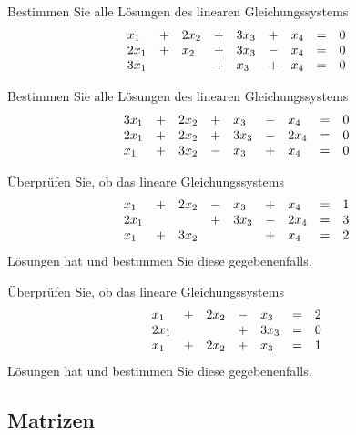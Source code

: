 \bigbreak

\begin{aufgabe} Bestimmen Sie alle Lösungen des linearen Gleichungssystems
  	$$ \begin{array} {l c l c l c l c l}
   	x_1 & + & 2 x_2 & + & 3 x_3 & + & x_4 & = & 0 \\
   	2 x_1 & +  & x_2 & + & 3 x_3 & - &  x_4 & = & 0 \\
   	3 x_1 &   &  & + & x_3 & + & x_4 & = & 0 
   	\end{array} $$
\end{aufgabe}

\begin{aufgabe} Bestimmen Sie alle Lösungen des linearen Gleichungssystems
  	$$ \begin{array} {l c l c l c l c l}
   	3 x_1 & + & 2 x_2 & + &  x_3 & - & x_4 & = & 0 \\
   	2 x_1 & +  & 2 x_2 & + & 3 x_3 & - & 2 x_4 & = & 0 \\
   	x_1 & + & 3 x_2 & - & x_3 & + & x_4 & = & 0 
   	\end{array} $$
\end{aufgabe}

\begin{aufgabe} \"Uberprüfen Sie, ob das lineare Gleichungssystems
  	$$ \begin{array} {l c l c l c l c l}
   	x_1 & + & 2 x_2 & - &  x_3 & + & x_4 & = & 1 \\
   	2 x_1 &   &   & + & 3 x_3 & - & 2 x_4 & = & 3 \\
   	x_1 & + & 3 x_2 &  &   & + & x_4 & = & 2 
   	\end{array} $$
Lösungen hat und bestimmen Sie diese gegebenenfalls.
\end{aufgabe}

\begin{aufgabe} \"Uberprüfen Sie, ob das lineare Gleichungssystems
  	$$ \begin{array} {l c l c l  c l}
   	x_1 & + & 2 x_2 & - &  x_3  & = & 2 \\
   	2 x_1 &   &   & + & 3 x_3  & = & 0 \\
   	x_1 & + & 2 x_2 & + &  x_3  & = & 1 
   \end{array} $$
Lösungen hat und bestimmen Sie diese gegebenenfalls.
\end{aufgabe}

\bigbreak

\subsection{Matrizen}\label{gls_matrix}

